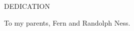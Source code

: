 \newpage
{}

\begin{center}
DEDICATION
\end{center}

\begin{center}
To my parents, Fern and Randolph Ness.
\end{center}

